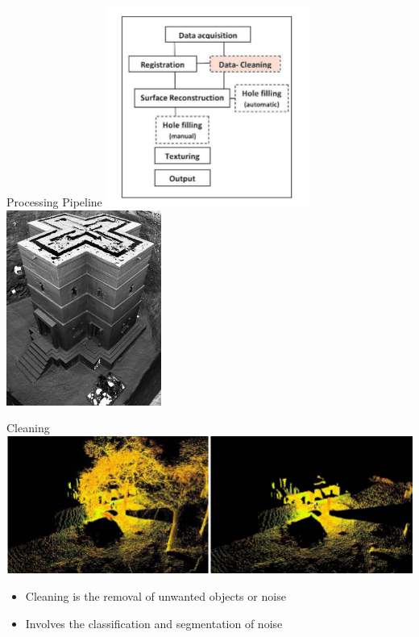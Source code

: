 \documentclass[compress]{beamer}
\begin{document}
\begin{frame}{Processing Pipeline}
  \includegraphics[width=0.50\textwidth]{pics/pipeline.png}
  \includegraphics[width=0.38\textwidth]{pics/zamani2.jpg}
\end{frame}

\begin{frame}{Cleaning}
  \includegraphics[width=1\textwidth]{pics/cleaning.png}
  \begin{itemize}
  \item
  Cleaning is the removal of unwanted objects or noise
  \item
  Involves the classification and segmentation of noise
  \end{itemize}
\end{frame}
\end{document}
